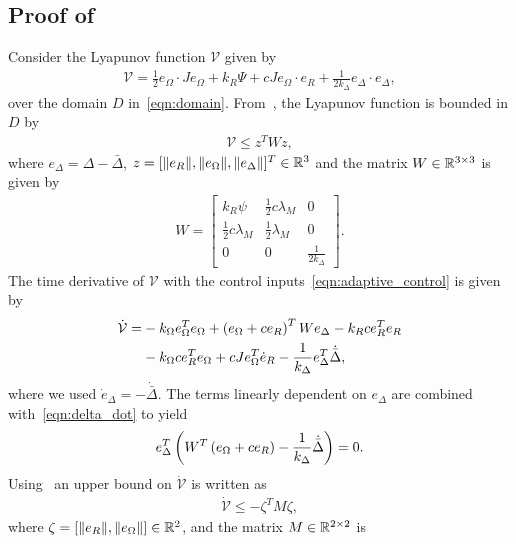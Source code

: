 \documentclass[letterpaper, 10 pt, conference]{ieeeconf}  %
\begin{document}
\subsection{Proof of~}\label{proof:adaptive_control}
	Consider the Lyapunov function \( \mathcal{V} \) given by
	\begin{gather}
		\mathcal{V} = \frac{1}{2} e_\Omega \cdot J e_\Omega + k_R \Psi + c J e_\Omega \cdot e_R + \frac{1}{2 k_\Delta} e_\Delta \cdot e_\Delta , \label{eqn:v_adapt}
	\end{gather}
	over the domain \( D \) in~\cref{eqn:domain}.
	From~, the Lyapunov function is bounded in \( D \) by
	\begin{gather}
		\mathcal{V} \leq z^T W z , \label{eqn:v_upper_bound}
	\end{gather}
	where \( e_\Delta = \Delta - \bar{\Delta} \), \( z = [\|e_R\|,\|e_\Omega\|,\|e_\Delta\|]^T\in\mathbb{R}^3 \) and the matrix \(W \in \mathbb{R}^{3 \times 3}\) is given by
	\begin{gather*}
		W = \begin{bmatrix}
			k_R \psi & \frac{1}{2} c \lambda_M & 0 \\
			\frac{1}{2} c \lambda_M & \frac{1}{2} \lambda_M & 0 \\
			0 & 0 & \frac{1}{2 k_\Delta}
		\end{bmatrix} .
	\end{gather*}
	The time derivative of \( \mathcal{V}\) with the control inputs~\cref{eqn:adaptive_control} is given by
	\begin{align}
		\dot{\mathcal{V}} =& - k_\Omega e_\Omega^T e_\Omega + \left( e_\Omega + c e_R \right)^T W e_\Delta - k_R c e_R^T e_R \nonumber\\
		&- k_\Omega c e_R^T e_\Omega + c J e_\Omega^T \dot{e}_R - \frac{1}{k_\Delta} e_\Delta^T \dot{\bar{\Delta}} , \label{eqn:vdot}
	\end{align}
	where we used \( \dot{e}_\Delta = - \dot{\bar{\Delta}} \).
	The terms linearly dependent on \( e_\Delta\) are combined with~\cref{eqn:delta_dot} to yield
	\begin{align*}
		 e_\Delta^T \left( W^T \left( e_\Omega + c e_R \right) - \frac{1}{k_\Delta} \dot{\bar{\Delta}} \right) = 0 . 
	\end{align*}
	Using~ an upper bound on \( \dot{\mathcal{V}} \) is written as
	\begin{gather*}
		\dot{\mathcal{V}} \leq -\zeta^T M \zeta ,
	\end{gather*}
	where $\zeta=[\|e_R\|,\|e_\Omega\|]\in\mathbb{R}^2$, and the matrix \( M \in \mathbb{R}^{2 \times 2} \) is 
\end{document}
